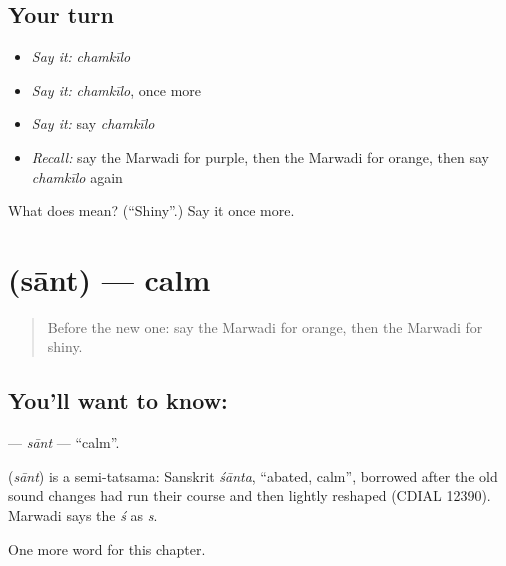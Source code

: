 \subsection*{Your turn}
\begin{itemize}
\raggedright
  \item \emph{Say it:} \emph{chamkīlo}
  \item \emph{Say it:} \emph{chamkīlo}, once more
  \item \emph{Say it:} say \emph{chamkīlo}
  \item \emph{Recall:} say the Marwadi for purple, then the Marwadi for orange, then say \emph{chamkīlo} again
\end{itemize}

\begin{tcolorbox}[breakable,colback=teal!4,colframe=teal!35!black,title={Before you move on}]
What does  mean? (\textquotedblleft{}Shiny\textquotedblright{}.) Say it once more.
\end{tcolorbox}
\section[\texorpdfstring{\mw{सांत} (sānt)}{सांत (sānt)}]{ (sānt) — calm}

\label{lesson:MW-C146-sant}



\begin{quote}
Before the new one: say the Marwadi for orange, then the Marwadi for shiny.
\end{quote}

\subsection*{You'll want to know: }
\textbf{} — \emph{sānt} — \textquotedblleft{}calm\textquotedblright{}.

\begin{cousinweb}
\textbf{} (\emph{sānt}) is a semi-tatsama: Sanskrit \emph{śānta}, \textquotedblleft{}abated, calm\textquotedblright{}, borrowed after the old sound changes had run their course and then lightly reshaped (CDIAL 12390). Marwadi says the \emph{ś} as \emph{s}.
\end{cousinweb}

\begin{grammarlens}[title={What you've built}]
One more word for this chapter.
\end{grammarlens}


